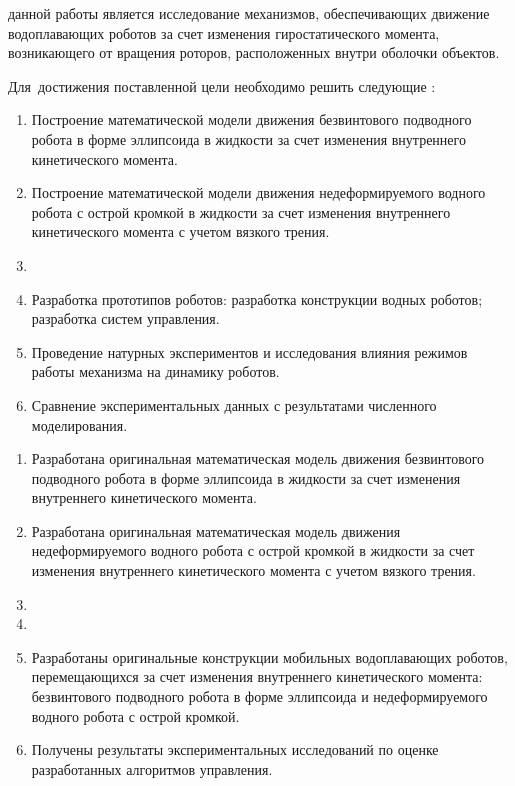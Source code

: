 {\aim} данной работы является исследование механизмов, обеспечивающих движение водоплавающих роботов за счет изменения гиростатического момента, возникающего от вращения роторов, расположенных внутри оболочки объектов.

Для~достижения поставленной цели необходимо решить следующие {\tasks}:
\begin{enumerate}
  \item Построение математической модели движения безвинтового подводного робота в форме эллипсоида в жидкости за счет изменения внутреннего кинетического момента.
  \item Построение математической модели движения недеформируемого водного робота с острой кромкой в жидкости за счет изменения внутреннего кинетического момента с учетом вязкого трения.
  \item {}
  \item Разработка прототипов роботов: разработка конструкции водных роботов; разработка систем управления.
  \item Проведение натурных экспериментов и исследования влияния режимов работы механизма на динамику роботов.
  \item Сравнение экспериментальных данных с результатами численного моделирования.
\end{enumerate}


{\novelty}
\begin{enumerate}
  \item Разработана оригинальная математическая модель движения безвинтового подводного робота в форме эллипсоида в жидкости за счет изменения внутреннего кинетического момента.
  \item Разработана оригинальная математическая модель движения недеформируемого водного робота с острой кромкой в жидкости за счет изменения внутреннего кинетического момента с учетом вязкого трения.
  \item {}
  \item {}
  \item Разработаны оригинальные конструкции мобильных водоплавающих роботов, перемещающихся за счет изменения внутреннего кинетического момента: безвинтового подводного робота в форме эллипсоида и недеформируемого водного робота с острой кромкой.
  \item Получены результаты экспериментальных исследований по оценке разработанных алгоритмов управления.
\end{enumerate}

